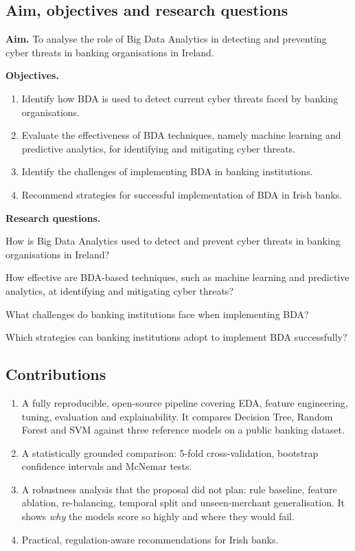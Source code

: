 \documentclass[12pt,a4paper]{article}
\begin{document}
\subsection{Aim, objectives and research questions}
\textbf{Aim.} To analyse the role of Big Data Analytics in detecting and preventing cyber threats in banking organisations in Ireland.

\textbf{Objectives.}
\begin{enumerate}[nosep]
\item Identify how BDA is used to detect current cyber threats faced by banking organisations.
\item Evaluate the effectiveness of BDA techniques, namely machine learning and predictive analytics, for identifying and mitigating cyber threats.
\item Identify the challenges of implementing BDA in banking institutions.
\item Recommend strategies for successful implementation of BDA in Irish banks.
\end{enumerate}

\textbf{Research questions.}
\begin{description}[nosep,leftmargin=1.2cm,labelwidth=1cm]
\item[RQ1] How is Big Data Analytics used to detect and prevent cyber threats in banking organisations in Ireland?
\item[RQ2] How effective are BDA-based techniques, such as machine learning and predictive analytics, at identifying and mitigating cyber threats?
\item[RQ3] What challenges do banking institutions face when implementing BDA?
\item[RQ4] Which strategies can banking institutions adopt to implement BDA successfully?
\end{description}

\subsection{Contributions}
\begin{enumerate}[nosep]
\item A fully reproducible, open-source pipeline covering EDA, feature engineering, tuning, evaluation and explainability. It compares Decision Tree, Random Forest and SVM against three reference models on a public banking dataset.
\item A statistically grounded comparison: 5-fold cross-validation, bootstrap confidence intervals and McNemar tests.
\item A robustness analysis that the proposal did not plan: rule baseline, feature ablation, re-balancing, temporal split and unseen-merchant generalisation. It shows \emph{why} the models score so highly and where they would fail.
\item Practical, regulation-aware recommendations for Irish banks.
\end{enumerate}
\end{document}
